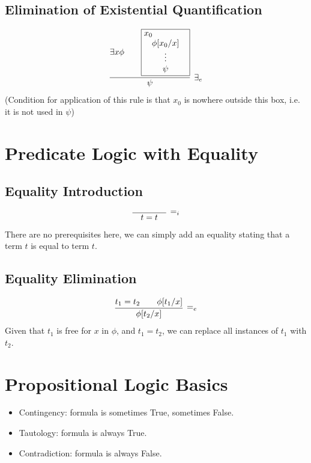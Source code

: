\documentclass{article}
\newcommand{\rulename}[1]{#1}
\newcommand{\hint}[1]{#1}
\newcommand{\myex}[2]{\exists #1 #2}
\begin{document}
\subsection*{Elimination of Existential Quantification}
    \begin{align*}
      \infer[\rulename{\exists_e}]
      {\psi}
      {
        \myex{x}{\phi} &&
        \framebox{\parbox{1.8cm}{\hint{$x_0$}\\\centerline{$\phi[x_0/x]$}\\\centerline{$\vdots$}\\\centerline{$\psi$}}}
      }
    \end{align*}
    (Condition for application of this rule is that $x_0$ is nowhere outside this box, i.e. it is not used in $\psi$)
\section*{Predicate Logic with Equality}
  \subsection*{Equality Introduction}
    \begin{align*}
      \infer[\rulename{=_i}]
      {\quad t=t \quad}
      {}
    \end{align*}
    There are no prerequisites here, we can simply add an equality stating that a term $t$ is equal to term $t$.
  \subsection*{Equality Elimination}
    \begin{align*}
      \infer[\rulename{=_e}]
      {\phi[t_2/x]}
      {t_1 = t_2 && \phi[t_1/x]}
    \end{align*}
    Given that $t_1$ is free for $x$ in $\phi$, and $t_1 = t_2$, we can replace all instances of $t_1$ with $t_2$.
    

\section*{Propositional Logic Basics}
\begin{itemize}
    \item Contingency: formula is sometimes True, sometimes False.
    \item Tautology: formula is always True.
    \item Contradiction: formula is always False.
\end{itemize}
\end{document}
